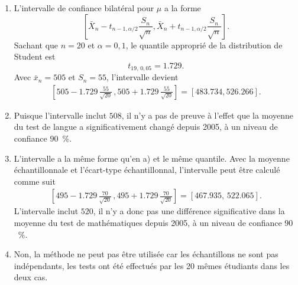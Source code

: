 \begin{solution}{5.9}
\begin{enumerate}
\item
L'intervalle de confiance bilatéral pour $\mu$ a la forme
$$
\left[ \bar X_n - t_{n-1,\alpha/2} \frac{S_n}{\sqrt{n}}, \bar X_n + t_{n-1,\alpha/2} \frac{S_n}{\sqrt{n}} \right].
$$
Sachant que $n=20$ et $\alpha =0,1$, le quantile approprié de la distribution de Student est
$$
t_{19, \, 0,05} = 1.729.
$$
Avec $\bar x_n = 505$ et $S_n = 55$, l'intervalle devient
\begin{align*}
\left[ 505 -  1.729 \, \frac{55}{\sqrt{20}} \, , 505 + 1.729 \, \frac{55}{\sqrt{20}} \right] = [ 483.734 ,526.266].
\end{align*}

\item Puisque l'intervalle inclut $508$, il n'y a pas de preuve à l'effet que la moyenne du test de langue a significativement changé depuis 2005, à un niveau de confiance $90$~\%.

\item
L'intervalle a la même forme qu'en a) et le même quantile. Avec la moyenne échantillonnale et l'écart-type échantillonnal, l'intervalle peut être calculé comme suit
\begin{align*}
\left[ 495 -  1.729 \, \frac{70}{\sqrt{20}}\, ,495 + 1.729 \, \frac{70}{\sqrt{20}} \right] = [ 467.935, \,522.065].
\end{align*}
L'intervalle inclut $520$, il n'y a donc pas une différence significative dans la moyenne du test de mathématiques depuis 2005, à un niveau de confiance $90$~\%.

\item
Non, la méthode ne peut pas être utilisée car les échantillons ne sont pas indépendants, les tests ont été effectués par les 20 mêmes étudiants dans les deux cas.


\end{enumerate}
\end{solution}

